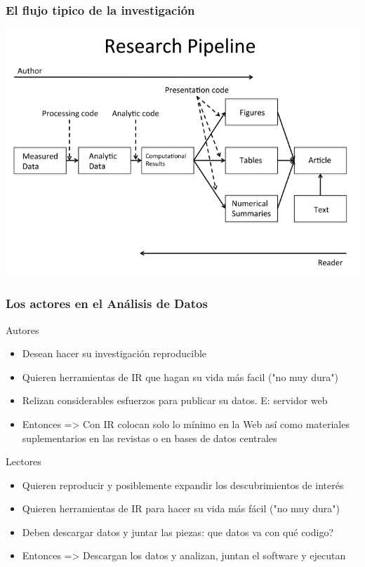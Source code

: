 \documentclass[sans serif,9pt,xcolor=dvipsnames]{beamer}%
\begin{document}
\begin{frame}
\frametitle{El flujo tipico de la investigación }
\justifying
\begin{block}{}
\includegraphics {imagenes/research_flow.png}  
\end{block}
\end{frame}

\begin{frame}
\frametitle{Los actores en el Análisis de Datos}
\justifying
\begin{block}{Autores} 
\begin{itemize}
  \item Desean hacer su investigación reproducible
  \item Quieren herramientas de IR que hagan su vida más facil ("no muy dura")
  \item Relizan considerables esfuerzos para publicar su datos. E: servidor web
  \item Entonces => Con IR colocan solo lo mínimo en la Web así como materiales suplementarios en las revistas o en bases de datos centrales
\end{itemize}
\end{block}
\begin{block}{Lectores} 
\begin{itemize}
  \item Quieren reproducir y posiblemente expandir los descubrimientos de interés
  \item Quieren herramientas de IR para hacer su vida más fácil ("no muy dura")
  \item Deben descargar datos y juntar las piezas: que datos va con qué codigo?
  \item Entonces => Descargan los datos y analizan, juntan el software y ejecutan
\end{itemize}
\end{block}
\end{frame}
\end{document}
